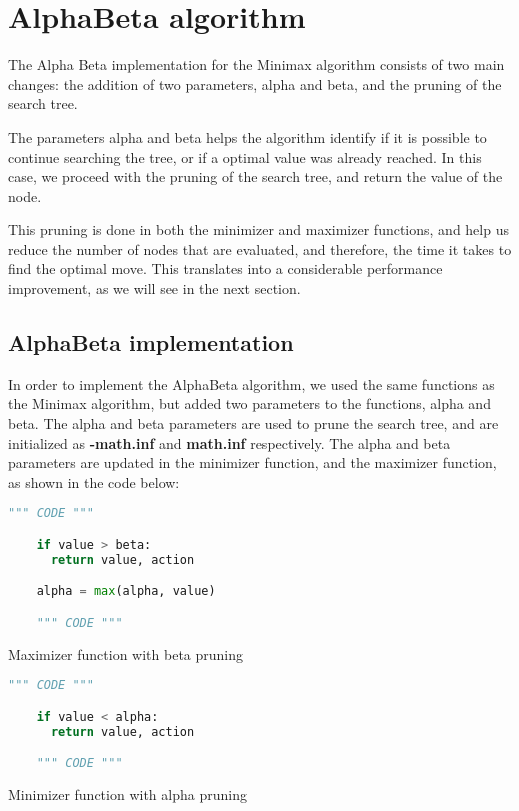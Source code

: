 \documentclass{article}
\begin{document}
\pagebreak
\section{AlphaBeta algorithm}

The Alpha Beta implementation for the Minimax algorithm consists of two main changes: the addition of two parameters, alpha and beta, and the pruning of the search tree.

The parameters alpha and beta helps the algorithm identify if it is possible to continue searching the tree, or if a optimal value was already reached. In this case, we proceed with the pruning of the search tree, and return the value of the node.

This pruning is done in both the minimizer and maximizer functions, and help us reduce the number of nodes that are evaluated, and therefore, the time it takes to find the optimal move. This translates into a considerable performance improvement, as we will see in the next section.

\subsection{AlphaBeta implementation}

In order to implement the AlphaBeta algorithm, we used the same functions as the Minimax algorithm, but added two parameters to the functions, alpha and beta. The alpha and beta parameters are used to prune the search tree, and are initialized as \textbf{-math.inf} and \textbf{math.inf} respectively. The alpha and beta parameters are updated in the minimizer function, and the maximizer function, as shown in the code below:

\begin{table}[!ht]
  \begin{lstlisting}[language=python, frame=tlbr, framesep=6pt, backgroundcolor=\color{light-gray}]
    """ CODE """

    if value > beta:
      return value, action

    alpha = max(alpha, value)

    """ CODE """
  \end{lstlisting}
  \caption{Maximizer function with beta pruning}
\end{table}

\begin{table}[!ht]
  \begin{lstlisting}[language=python, frame=tlbr, framesep=6pt, backgroundcolor=\color{light-gray}]
    """ CODE """

    if value < alpha:
      return value, action

    """ CODE """
  \end{lstlisting}
  \caption{Minimizer function with alpha pruning}
\end{table}
\end{document}
